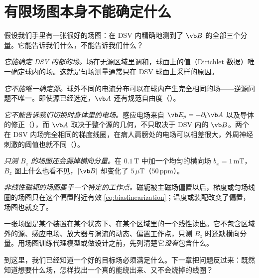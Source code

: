 \section{有限场图本身不能确定什么}\label{sec:mri-limits}

假设我们手里有一张很好的场图：在 DSV 内精确地测到了 $\vb B$ 的全部三个分量。它能告诉我们什么，不能告诉我们什么？

\emph{它能确定 DSV 内部的场。}场在无源区域里调和，球面上的值（Dirichlet 数据）唯一确定球内的场。这就是匀场测量通常只在 DSV 球面上采样的原因。

\emph{它不能唯一确定源。}球外不同的电流分布可以在球内产生完全相同的场——逆源问题不唯一。即使源已经选定，$\vb A$ 还有规范自由度（）。

\emph{它不能告诉我们切换时身体里的电场。}感应电场来自 $\vb E_p=-\partial_t\vb A$ 以及导体的修正（），而 $\vb A$ 取决于整个源的几何，不只取决于 DSV 内的 $\vb B$。两个在 DSV 内场完全相同的梯度线圈，在病人肩膀处的电场可以相差很大，外周神经刺激的阈值也就不同（）。

\emph{只测 $B_z$ 的场图还会漏掉横向分量。}在 $0.1\,\mathrm T$ 中加一个均匀的横向场 $b_x=1\,\mathrm{mT}$，$B_z$ 图上什么也看不见，$|\vb B|$ 却变化了 $5\,\mu\mathrm T$（$50\,\mathrm{ppm}$）。

\emph{非线性磁轭的场图属于一个特定的工作点。}磁轭被主磁场偏置以后，梯度或匀场线圈的场图只在这个偏置附近有效 \eqref{eq:biaslinearization}；温度或装配改变了偏置，场图也就变了。

\begin{pitfall}
一张场图是某个装置在某个状态下、在某个区域里的一个线性读出。它不包含区域外的源、感应电场、放大器与涡流的动态、偏置工作点，只测 $B_z$ 时还缺横向分量。用场图训练代理模型或做设计之前，先列清楚它\emph{没有}包含什么。
\end{pitfall}

到这里，我们已经知道一个好的目标场必须满足什么。下一章把问题反过来：既然知道想要什么场，怎样找出一个真的能绕出来、又不会烧掉的线圈？

